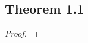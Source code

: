 \documentclass[../../main.tex]{subfiles}
\begin{document}
\subsection{Theorem 1.1}
\begin{wts}

\end{wts}
\begin{proof}

\end{proof}
\end{document}
